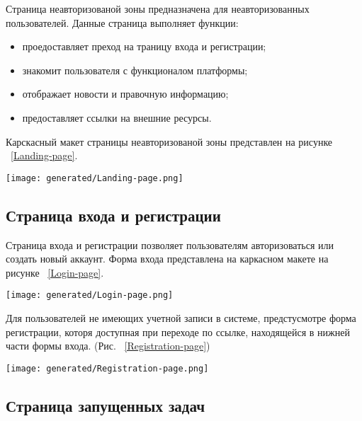 Страница неавторизованой зоны предназначена для неавторизованных пользователей. Данные страница выполняет функции:

\begin{itemize}
  \item[---] проедоставляет преход на траницу входа и регистрации;
  \item[---] знакомит пользователя с функционалом платформы;
  \item[---] отображает новости и правочную информацию;
  \item[---] предоставляет ссылки на внешние ресурсы.
\end{itemize}

Карскасный макет страницы неавторизованой зоны представлен на рисунке ~\ref{Landing-page}.

\begin{figure*}[!t]
  \centering
  \texttt{[image: generated/Landing-page.png]}
  \caption{Каркасный макет страницы неавторизованой зоны}
  \label{Landing-page}
\end{figure*}

\subsection{Страница входа и регистрации}

Страница входа и регистрации позволяет пользователям авторизоваться или создать новый аккаунт. Форма входа представлена на каркасном макете на рисунке ~\ref{Login-page}.

\begin{figure*}[!t]
  \centering
  \texttt{[image: generated/Login-page.png]}
  \caption{Каркасный макет страницы входа}
  \label{Login-page}
\end{figure*}

Для пользователей не имеющих учетной записи в системе, предстусмотре форма регистрации, которя доступная при переходе по ссылке, находящейся в нижней части формы входа. (Рис. ~\ref{Registration-page})

\begin{figure*}[!t]
  \centering
  \texttt{[image: generated/Registration-page.png]}
  \caption{Каркасный макет страницы регистрации пользователя}
  \label{Registration-page}
\end{figure*}

\subsection{Страница запущенных задач}


